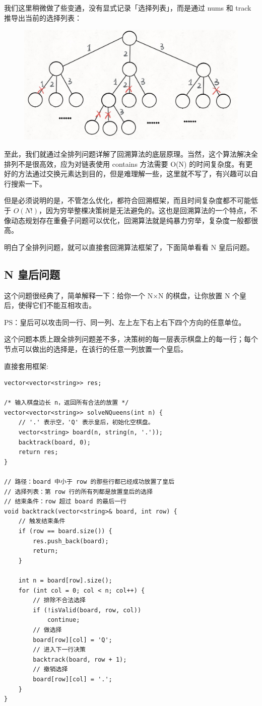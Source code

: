 \documentclass[12pt]{article}
\begin{document}
我们这里稍微做了些变通，没有显式记录「选择列表」，而是通过 nums 和 track 推导出当前的选择列表：
\begin{figure}[H]
    \centering
    \includegraphics[width=.5\textwidth]{fig/Backtrack_6.png}
\end{figure}

至此，我们就通过全排列问题详解了回溯算法的底层原理。当然，这个算法解决全排列不是很高效，应为对链表使用 contains 方法需要 O(N) 的时间复杂度。有更好的方法通过交换元素达到目的，但是难理解一些，这里就不写了，有兴趣可以自行搜索一下。

但是必须说明的是，不管怎么优化，都符合回溯框架，而且时间复杂度都不可能低于 $O(N!)$，因为穷举整棵决策树是无法避免的。这也是回溯算法的一个特点，不像动态规划存在重叠子问题可以优化，回溯算法就是纯暴力穷举，复杂度一般都很高。

明白了全排列问题，就可以直接套回溯算法框架了，下面简单看看 N 皇后问题。

\subsection{N 皇后问题}
这个问题很经典了，简单解释一下：给你一个 N×N 的棋盘，让你放置 N 个皇后，使得它们不能互相攻击。

PS：皇后可以攻击同一行、同一列、左上左下右上右下四个方向的任意单位。

这个问题本质上跟全排列问题差不多，决策树的每一层表示棋盘上的每一行；每个节点可以做出的选择是，在该行的任意一列放置一个皇后。

直接套用框架:
\begin{lstlisting}
vector<vector<string>> res;

/* 输入棋盘边长 n，返回所有合法的放置 */
vector<vector<string>> solveNQueens(int n) {
    // '.' 表示空，'Q' 表示皇后，初始化空棋盘。
    vector<string> board(n, string(n, '.'));
    backtrack(board, 0);
    return res;
}

// 路径：board 中小于 row 的那些行都已经成功放置了皇后
// 选择列表：第 row 行的所有列都是放置皇后的选择
// 结束条件：row 超过 board 的最后一行
void backtrack(vector<string>& board, int row) {
    // 触发结束条件
    if (row == board.size()) {
        res.push_back(board);
        return;
    }
    
    int n = board[row].size();
    for (int col = 0; col < n; col++) {
        // 排除不合法选择
        if (!isValid(board, row, col)) 
            continue;
        // 做选择
        board[row][col] = 'Q';
        // 进入下一行决策
        backtrack(board, row + 1);
        // 撤销选择
        board[row][col] = '.';
    }
}
\end{lstlisting}
\end{document}
